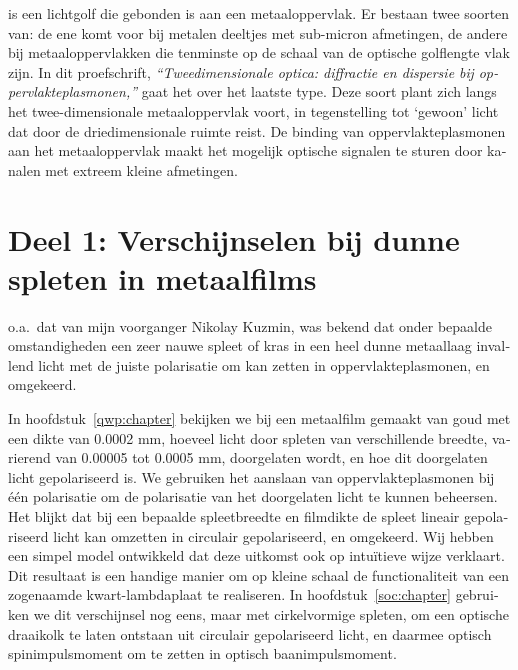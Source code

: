 \begin{otherlanguage}{dutch}


 is een lichtgolf die gebonden is aan een metaaloppervlak.
Er bestaan twee soorten van: de ene komt voor bij metalen deeltjes met sub-micron afmetingen, de andere bij metaaloppervlakken die tenminste op de schaal van de optische golflengte vlak zijn.
In dit proefschrift, \emph{``Tweedimensionale optica: diffractie en dispersie bij oppervlakteplasmonen,''} gaat het over het laatste type. Deze soort plant zich langs het twee-dimensionale metaaloppervlak voort, in tegenstelling tot `gewoon' licht dat door de driedimensionale ruimte reist.
De binding van oppervlakteplasmonen aan het metaaloppervlak maakt het mogelijk optische signalen te sturen door kanalen met extreem kleine afmetingen.

\section*{Deel 1: Verschijnselen bij dunne spleten in metaalfilms}

 o.a.\ dat van mijn voorganger Nikolay Kuzmin, was bekend dat onder bepaalde omstandigheden een zeer nauwe spleet of kras in een heel dunne metaallaag invallend licht met de juiste polarisatie om kan zetten in oppervlakteplasmonen, en omgekeerd.

In hoofdstuk~\ref{qwp:chapter} bekijken we bij een metaalfilm gemaakt van goud met een dikte van 0.0002 mm, hoeveel licht door spleten van verschillende breedte, varierend van 0.00005 tot 0.0005 mm, doorgelaten wordt, en hoe dit doorgelaten licht gepolariseerd is.
We gebruiken het aanslaan van oppervlakteplasmonen bij één polarisatie om de polarisatie van het doorgelaten licht te kunnen beheersen.
Het blijkt dat bij een bepaalde spleetbreedte en filmdikte de spleet lineair gepolariseerd licht kan omzetten in circulair gepolariseerd, en omgekeerd.
Wij hebben een simpel model ontwikkeld dat deze uitkomst ook op intuïtieve wijze verklaart.
Dit resultaat is een handige manier om op kleine schaal de functionaliteit van een zogenaamde kwart-lambdaplaat te realiseren.
In hoofdstuk~\ref{soc:chapter} gebruiken we dit verschijnsel nog eens, maar met cirkelvormige spleten, om een optische draaikolk te laten ontstaan uit circulair gepolariseerd licht, en daarmee optisch spinimpulsmoment om te zetten in optisch baanimpulsmoment.


\end{otherlanguage}
